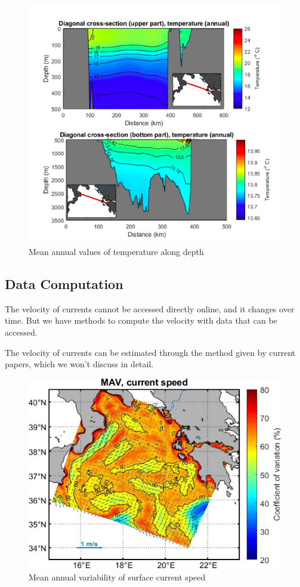 \documentclass[12pt]{article}
\begin{document}
\begin{figure}[H]
\centering
\includegraphics[width=.9\textwidth]{temperature.png}
\caption{Mean annual values of temperature along depth\cite{Blue-greenway}}
\label{fig:Bathymetry}
\end{figure}
\vspace{-0.8cm}

\subsection{Data Computation}
The velocity of currents cannot be accessed directly online, and it changes over time. But we have methods to compute the velocity with data that can be accessed.  

The velocity of currents can be estimated through the method given by current papers\cite{Ionian Sea Research,Blue-greenway}, which we won't discuss in detail.

\begin{figure}[H]
\centering
\includegraphics[width=.9\textwidth]{current speed.png}
\caption{Mean annual variability of surface current speed\cite{Blue-greenway}}
\label{fig:Bathymetry}
\end{figure}
\vspace{-0.8cm}
\end{document}

